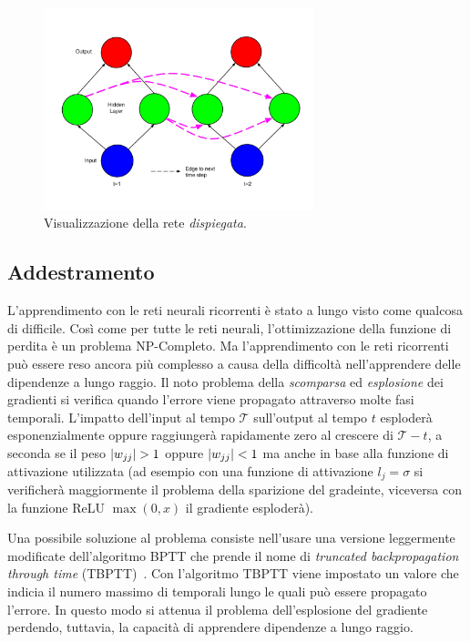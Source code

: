 \begin{figure}[tp]
  \centering
  \begin{center}
    \includegraphics[width=0.7\textwidth]{./images/unfoldedSimpleRecurrentNeuralNetwork.png}
  \end{center}
  \caption{Visualizzazione della rete \emph{dispiegata}.}
  \label{fig:unfoldedSimpleRecurrentNeuralNetwork}
\end{figure}

\subsection{Addestramento}
L'apprendimento con le reti neurali ricorrenti \`e stato a lungo visto come qualcosa di difficile.
Cos\`i come per tutte le reti neurali, l'ottimizzazione della funzione di perdita \`e un problema NP-Completo.
Ma l'apprendimento con le reti ricorrenti pu\`o essere reso ancora pi\`u complesso a causa della difficolt\`a nell'apprendere delle dipendenze a lungo raggio.
Il noto problema della \emph{scomparsa} ed \emph{esplosione} dei gradienti si verifica quando l'errore viene propagato attraverso molte fasi temporali.
 L'impatto dell'input al tempo $\mathcal{T}$ sull'output al tempo $t$ esploder\`a esponenzialmente oppure raggiunger\`a rapidamente zero al crescere di $\mathcal{T} - t$, a seconda se il peso $\lvert w_{jj}\rvert>1$ oppure $\lvert w_{jj}\rvert<1$ ma anche in base alla funzione di attivazione utilizzata %
(ad esempio con una funzione di attivazione $l_j = \sigma$ si verificher\`a maggiormente il problema della sparizione del gradeinte, viceversa con la funzione ReLU $\operatorname{max}(0, x)$ il gradiente esploder\`a).

Una possibile soluzione al problema consiste nell'usare una versione leggermente modificate dell'algoritmo BPTT che prende il nome di \emph{truncated backpropagation through time} (TBPTT)~\cite{Williams:1989}.
Con l'algoritmo TBPTT viene impostato un valore che indicia il numero massimo di temporali lungo le quali pu\`o essere propagato l'errore.
In questo modo si attenua il problema dell'esplosione del gradiente perdendo, tuttavia, la capacit\`a di apprendere dipendenze a lungo raggio.


